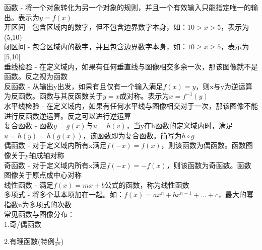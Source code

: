 \documentclass[UTF8,fontset=ubuntu]{ctexart}
\begin{document}
函数 - 将一个对象转化为另一个对象的规则，并且一个有效输入只能指定唯一的输出。表示为$y=f(x)$\\
开区间 - 包含区域内的数字，但不包含边界数字本身，如：$10 > x > 5$，表示为(5,10)\\
闭区间 - 包含区域内的数字，并且包含边界数字本身，如：$10 \geq x \geq 5$，表示为[5,10]\\
垂线检验 - 在定义域内，如果有任何垂直线与图像相交多余一次，那该图像就不是函数。反之视为函数\\
反函数 - 从输出y出发，如果有且仅有一个输入满足$f(x)=y$，则x与y为逆运算为反函数。函数与其反函数关于$y=x$成对称。表示为$x=f^{-1}(y)$\\
水平线检验 - 在定义域内，如果有任何水平线与图像相交对于一次，那该图像不能进行反函数逆运算。反之可以进行逆运算\\
复合函数 - 函数$y=g(x)$与$u=h(v)$，当y在h函数的定义域内时，满足$u=h(y)=h(g(x))$，该函数即为复合函数。简写为$h \circ g$\\
偶函数 - 对于定义域内所有x满足$f(-x)=f(x)$，则该函数为偶函数。函数图像关于y轴成轴对称\\
奇函数 - 对于定义域内所有x满足$f(-x)=-f(x)$，则该函数为奇函数。函数图像关于原点成中心对称\\
线性函数 - 满足$f(x)=mx+b$公式的函数，称为线性函数\\
多项式 - 将多个基本项加在一起。如：$f(x)=ax^n+bx^{n-1}+...+c$，最大的幂指数n为多项式的次数\\
常见函数与图像分布：\\
1.奇/偶函数\\
\begin{figure}[H]
\end{figure}
2.有理函数(特例$\frac{1}{x^n}$)\\
\begin{figure}[H]
\end{figure}
\end{document}
